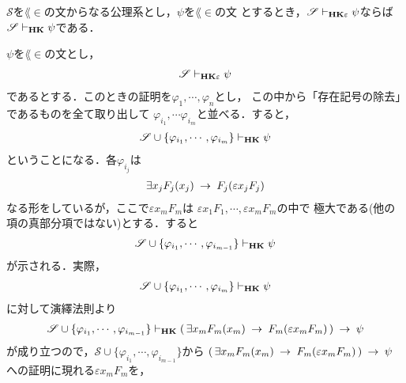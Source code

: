	\begin{screen}
		\begin{metathm}
		\label{metathm:Henkin_expansion_2}
			$\mathscr{S}$を$\lang{\in}$の文からなる公理系とし，$\psi$を$\lang{\in}$の文
			とするとき，$\mathscr{S} \vdash_{{\scriptsize \mbox{{\bf HK$\varepsilon$}}}} \psi$ならば
			$\mathscr{S} \vdash_{{\scriptsize \mbox{{\bf HK}}}} \psi$である．
		\end{metathm}
	\end{screen}
	
	\begin{sketch}
		$\psi$を$\lang{\in}$の文とし，
		\begin{align}
			\mathscr{S} \vdash_{{\scriptsize \mbox{{\bf HK$\varepsilon$}}}} \psi
		\end{align}
		であるとする．このときの証明を$\varphi_{1},\cdots,\varphi_{n}$とし，
		この中から「存在記号の除去」であるものを全て取り出して
		$\varphi_{i_{1}},\cdots\varphi_{i_{m}}$と並べる．すると，
		\begin{align}
			\mathscr{S} \cup \{\varphi_{i_{1}},\cdots,\varphi_{i_{m}}\} 
			\vdash_{{\scriptsize \mbox{{\bf HK}}}} \psi
		\end{align}
		ということになる．各$\varphi_{i_{j}}$は
		\begin{align}
			\exists x_{j} F_{j}(x_{j}) \hspace{0.25em}\rightarrow\hspace{0.25em} F_{j}(\varepsilon x_{j} F_{j})
		\end{align}
		なる形をしているが，ここで$\varepsilon x_{m} F_{m}$は
		$\varepsilon x_{1} F_{1},\cdots,\varepsilon x_{m} F_{m}$の中で
		極大である(他の項の真部分項ではない)とする．すると
		\begin{align}
			\mathscr{S} \cup \{\varphi_{i_{1}},\cdots,\varphi_{i_{m-1}}\} 
			\vdash_{{\scriptsize \mbox{{\bf HK}}}} \psi
		\end{align}
		が示される．実際，
		\begin{align}
			\mathscr{S} \cup \{\varphi_{i_{1}},\cdots,\varphi_{i_{m}}\} 
			\vdash_{{\scriptsize \mbox{{\bf HK}}}} \psi
		\end{align}
		に対して演繹法則より
		\begin{align}
			\mathscr{S} \cup \{\varphi_{i_{1}},\cdots,\varphi_{i_{m-1}}\} 
			\vdash_{{\scriptsize \mbox{{\bf HK}}}} 
			(\, \exists x_{m} F_{m}(x_{m}) \hspace{0.25em}\rightarrow\hspace{0.25em} F_{m}(\varepsilon x_{m} F_{m})\, ) \hspace{0.25em}\rightarrow\hspace{0.25em} \psi
		\end{align}
		が成り立つので，$\mathscr{S} \cup \{\varphi_{i_{1}},\cdots,\varphi_{i_{m-1}}\}$から
		$(\, \exists x_{m} F_{m}(x_{m}) \hspace{0.25em}\rightarrow\hspace{0.25em} F_{m}(\varepsilon x_{m} F_{m})\, ) \hspace{0.25em}\rightarrow\hspace{0.25em} \psi$
		への証明に現れる$\varepsilon x_{m} F_{m}$を，

\end{sketch}
